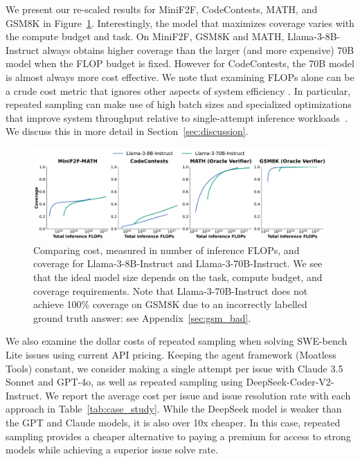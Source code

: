 \documentclass[11pt]{article}
\begin{document}
We present our re-scaled results for MiniF2F, CodeContests, MATH, and GSM8K in Figure~\ref{fig:flops}. Interestingly, the model that maximizes coverage varies with the compute budget and task. On MiniF2F, GSM8K and MATH, Llama-3-8B-Instruct always obtains higher coverage than the larger (and more expensive) 70B model when the FLOP budget is fixed. 
However for CodeContests, the 70B model is almost always more cost effective.
We note that examining FLOPs alone can be a crude cost metric that ignores other aspects of system efficiency \cite{dehghani2022efficiencymisnomer}. 
In particular, repeated sampling can make use of high batch sizes and specialized optimizations that improve system throughput relative to single-attempt inference workloads~\cite{juravsky2024hydragen, athiwaratkun2024bifurcatedattentionacceleratingmassively, zheng2024sglangefficientexecutionstructured}. 
We discuss this in more detail in Section~\ref{sec:discussion}.

\begin{figure}
    \centering
    \includegraphics[width=\textwidth]{figures/flops.pdf}
    \caption{Comparing cost, measured in number of inference FLOPs, and coverage for Llama-3-8B-Instruct and Llama-3-70B-Instruct. We see that the ideal model size depends on the task, compute budget, and coverage requirements. Note that Llama-3-70B-Instruct does not achieve 100\% coverage on GSM8K due to an incorrectly labelled ground truth answer: see Appendix~\ref{sec:gsm_bad}.}
    \label{fig:flops}
\end{figure}

We also examine the dollar costs of repeated sampling when solving SWE-bench Lite issues using current API pricing. Keeping the agent framework (Moatless Tools) constant, we consider making a single attempt per issue with Claude 3.5 Sonnet and GPT-4o, as well as repeated sampling using DeepSeek-Coder-V2-Instruct. We report the average cost per issue and issue resolution rate with each approach in Table~\ref{tab:case_study}. While the DeepSeek model is weaker than the GPT and Claude models, it is also over 10x cheaper. In this case, repeated sampling provides a cheaper alternative to paying a premium for access to strong models while achieving a superior issue solve rate.
\end{document}

